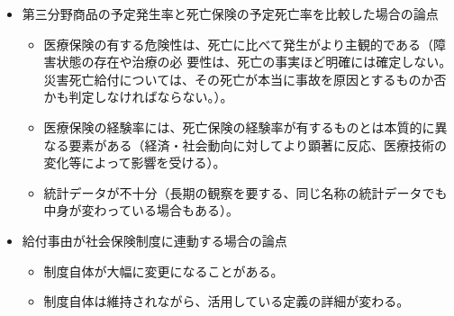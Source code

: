 \documentclass[report,gutter=10mm,fore-edge=10mm,uplatex,dvipdfmx]{jlreq}
\begin{document}
\begin{itemize}
 \item 第三分野商品の予定発生率と死亡保険の予定死亡率を比較した場合の論点
\begin{itemize}
 \item 医療保険の有する危険性は、死亡に比べて発生がより主観的である（障害状態の存在や治療の必
要性は、死亡の事実ほど明確には確定しない。災害死亡給付については、その死亡が本当に事故を原因とするものか否かも判定しなければならない。）。
 \item 医療保険の経験率には、死亡保険の経験率が有するものとは本質的に異なる要素がある（経済・社会動向に対してより顕著に反応、医療技術の変化等によって影響を受ける）。
 \item 統計データが不十分（長期の観察を要する、同じ名称の統計データでも中身が変わっている場合もある）。
\end{itemize}
 \item 給付事由が社会保険制度に連動する場合の論点
\begin{itemize}
 \item 制度自体が大幅に変更になることがある。
 \item 制度自体は維持されながら、活用している定義の詳細が変わる。
\end{itemize}
\end{itemize}
\end{document}
